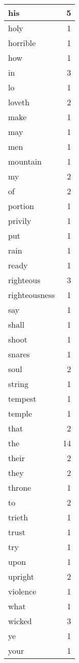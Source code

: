 \begin{center}
\begin{longtable}{l|r}
his & 5 \\ \hline
holy & 1 \\ \hline
horrible & 1 \\ \hline
how & 1 \\ \hline
in & 3 \\ \hline
lo & 1 \\ \hline
loveth & 2 \\ \hline
make & 1 \\ \hline
may & 1 \\ \hline
men & 1 \\ \hline
mountain & 1 \\ \hline
my & 2 \\ \hline
of & 2 \\ \hline
portion & 1 \\ \hline
privily & 1 \\ \hline
put & 1 \\ \hline
rain & 1 \\ \hline
ready & 1 \\ \hline
righteous & 3 \\ \hline
righteousness & 1 \\ \hline
say & 1 \\ \hline
shall & 1 \\ \hline
shoot & 1 \\ \hline
snares & 1 \\ \hline
soul & 2 \\ \hline
string & 1 \\ \hline
tempest & 1 \\ \hline
temple & 1 \\ \hline
that & 2 \\ \hline
the & 14 \\ \hline
their & 2 \\ \hline
they & 2 \\ \hline
throne & 1 \\ \hline
to & 2 \\ \hline
trieth & 1 \\ \hline
trust & 1 \\ \hline
try & 1 \\ \hline
upon & 1 \\ \hline
upright & 2 \\ \hline
violence & 1 \\ \hline
what & 1 \\ \hline
wicked & 3 \\ \hline
ye & 1 \\ \hline
your & 1 \\ \hline
\end{longtable}
\end{center}



